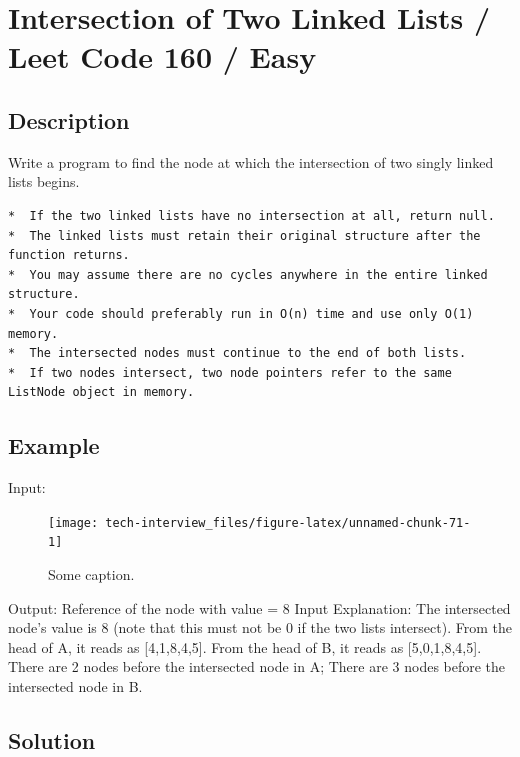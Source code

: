 \documentclass[]{book}
\begin{document}
\hypertarget{intersection-of-two-linked-lists-leet-code-160-easy}{%
\section{Intersection of Two Linked Lists / Leet Code 160 / Easy}\label{intersection-of-two-linked-lists-leet-code-160-easy}}

\hypertarget{description-96}{%
\subsection{Description}\label{description-96}}

Write a program to find the node at which the intersection of two singly linked lists begins.

\begin{verbatim}
*  If the two linked lists have no intersection at all, return null.
*  The linked lists must retain their original structure after the function returns.
*  You may assume there are no cycles anywhere in the entire linked structure.
*  Your code should preferably run in O(n) time and use only O(1) memory.
*  The intersected nodes must continue to the end of both lists.
*  If two nodes intersect, two node pointers refer to the same ListNode object in memory.
\end{verbatim}

\hypertarget{example-92}{%
\subsection{Example}\label{example-92}}

Input:

\begin{figure}
\texttt{[image: tech-interview\_files/figure-latex/unnamed-chunk-71-1]} \caption{Some caption.}\label{fig:unnamed-chunk-71}
\end{figure}

Output: Reference of the node with value = 8
Input Explanation: The intersected node's value is 8 (note that this must not be 0 if the two lists
intersect). From the head of A, it reads as {[}4,1,8,4,5{]}. From the head of B, it reads as
{[}5,0,1,8,4,5{]}. There are 2 nodes before the intersected node in A; There are 3 nodes before the
intersected node in B.

\hypertarget{solution-67}{%
\subsection{Solution}\label{solution-67}}
\end{document}

